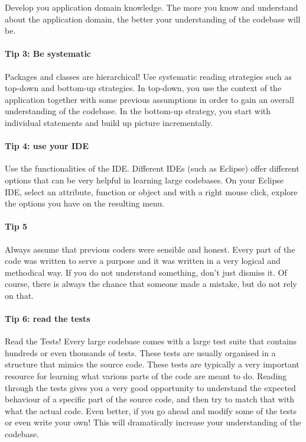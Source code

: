 \documentclass[
]{book}
\begin{document}
Develop you application domain knowledge. The more you know and understand about the application domain, the better your understanding of the codebase will be.

\hypertarget{tip3}{%
\paragraph{Tip 3: Be systematic}\label{tip3}}

Packages and classes are hierarchical! Use systematic reading strategies such as top-down and bottom-up strategies. In top-down, you use the context of the application together with some previous assumptions in order to gain an overall understanding of the codebase. In the bottom-up strategy, you start with individual statements and build up picture incrementally.

\hypertarget{tip4}{%
\paragraph{Tip 4: use your IDE}\label{tip4}}

Use the functionalities of the IDE. Different IDEs (such as Eclipse) offer different options that can be very helpful in learning large codebases. On your Eclipse IDE, select an attribute, function or object and with a right mouse click, explore the options you have on the resulting menu.

\hypertarget{tip5}{%
\paragraph{Tip 5}\label{tip5}}

Always assume that previous coders were sensible and honest. Every part of the code was written to serve a purpose and it was written in a very logical and methodical way. If you do not understand something, don't just dismiss it. Of course, there is always the chance that someone made a mistake, but do not rely on that.

\hypertarget{tip6}{%
\paragraph{Tip 6: read the tests}\label{tip6}}

Read the Tests! Every large codebase comes with a large test suite that contains hundreds or even thousands of tests. These tests are usually organised in a structure that mimics the source code. These tests are typically a very important resource for learning what various parts of the code are meant to do. Reading through the tests gives you a very good opportunity to understand the expected behaviour of a specific part of the source code, and then try to match that with what the actual code. Even better, if you go ahead and modify some of the tests or even write your own! This will dramatically increase your understanding of the codebase.
\end{document}
